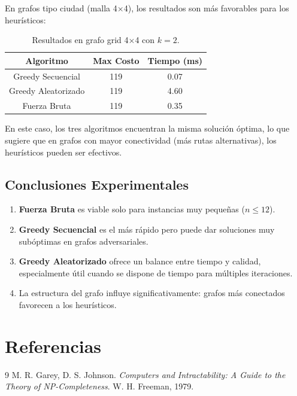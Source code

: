 \documentclass[11pt]{article}
\begin{document}
En grafos tipo ciudad (malla 4$\times$4), los resultados son más favorables para los heurísticos:

\begin{table}[h]
\centering
\begin{tabular}{|c|c|c|}
\hline
\textbf{Algoritmo} & \textbf{Max Costo} & \textbf{Tiempo (ms)} \\
\hline
Greedy Secuencial    & 119 & 0.07 \\
Greedy Aleatorizado  & 119 & 4.60 \\
Fuerza Bruta         & 119 & 0.35 \\
\hline
\end{tabular}
\caption{Resultados en grafo grid 4$\times$4 con $k=2$.}
\label{tab:grid}
\end{table}

En este caso, los tres algoritmos encuentran la misma solución óptima, lo que sugiere que en grafos con mayor conectividad (más rutas alternativas), los heurísticos pueden ser efectivos.

\subsection{Conclusiones Experimentales}
\begin{enumerate}
  \item \textbf{Fuerza Bruta} es viable solo para instancias muy pequeñas ($n \le 12$).
  \item \textbf{Greedy Secuencial} es el más rápido pero puede dar soluciones muy subóptimas en grafos adversariales.
  \item \textbf{Greedy Aleatorizado} ofrece un balance entre tiempo y calidad, especialmente útil cuando se dispone de tiempo para múltiples iteraciones.
  \item La estructura del grafo influye significativamente: grafos más conectados favorecen a los heurísticos.
\end{enumerate}

\section{Referencias}
\begin{thebibliography}{9}
 M. R. Garey, D. S. Johnson. \emph{Computers and Intractability: A Guide to the Theory of NP-Completeness}. W. H. Freeman, 1979.
\end{thebibliography}
\end{document}
